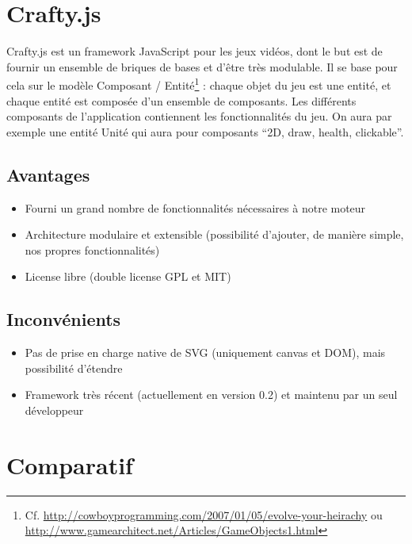 \documentclass[a4paper,10pt]{report}
\begin{document}
\section{Crafty.js}

Crafty.js est un framework JavaScript pour les jeux vidéos, dont le but est de fournir un ensemble de briques de bases et d'être très modulable. Il se base pour cela sur le modèle Composant / Entité\footnote{Cf. \url{http://cowboyprogramming.com/2007/01/05/evolve-your-heirachy} ou \url{http://www.gamearchitect.net/Articles/GameObjects1.html}} : chaque objet du jeu est une entité, et chaque entité est composée d'un ensemble de composants. Les différents composants de l'application contiennent les fonctionnalités du jeu. On aura par exemple une entité Unité qui aura pour composants ``2D, draw, health, clickable''. 

\subsection{Avantages}

\begin{itemize}
  \item Fourni un grand nombre de fonctionnalités nécessaires à notre moteur
  \item Architecture modulaire et extensible (possibilité d'ajouter, de manière simple, nos propres fonctionnalités)
  \item License libre (double license GPL et MIT)
\end{itemize}


\subsection{Inconvénients}

\begin{itemize}
 \item Pas de prise en charge native de SVG (uniquement canvas et DOM), mais possibilité d'étendre
 \item Framework très récent (actuellement en version 0.2) et maintenu par un seul développeur
\end{itemize}


\section{Comparatif}
\end{document}
